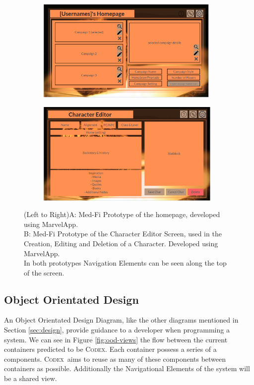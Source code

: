 \documentclass[progress]{cmpreport}
\newcommand{\Codex}{\textsc{Codex}}
\begin{document}
		\begin{figure}
			\begin{subfigure}{0.5\textwidth}
				\includegraphics[width=1\linewidth, height=5cm]{homepage.png}
			\end{subfigure}
			\begin{subfigure}{0.5\textwidth}
				\includegraphics[width=1\linewidth, height=5cm]{character.png}
			\end{subfigure}
			\caption{(Left to Right)A: Med-Fi Prototype of the homepage, developed using MarvelApp. \\ B: Med-Fi Prototype of the Character Editor Screen, used in the Creation, Editing and Deletion of a Character. Developed using MarvelApp. \\ In both prototypes Navigation Elements can be seen along the top of the screen.}
			\label{fig:med-fi}
		\end{figure}
		
		\subsection{Object Orientated Design}
		An Object Orientated Design Diagram, like the other diagrams mentioned in Section \ref{sec:design}, provide guidance to a developer when programming a system. We can see in Figure \ref{fig:ood-views} the flow between the current containers predicted to be \Codex. Each container possess a series of a components. \Codex \ aims to reuse as many of these components between containers as possible. Additionally the Navigational Elements of the system will be a shared view. 
		
\end{document}
